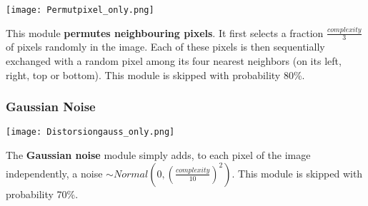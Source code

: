 \documentclass{article} %
\begin{document}
\begin{minipage}[t]{0.14\textwidth}
\begin{center}
\vspace*{1mm}
\texttt{[image: Permutpixel\_only.png]}
\end{center}
\end{minipage}%
\hspace{3mm}\begin{minipage}[t]{0.86\linewidth}
\vspace*{1mm}
This module {\bf permutes neighbouring pixels}. It first selects a
fraction $\frac{complexity}{3}$ of pixels randomly in the image. Each
of these pixels is then sequentially exchanged with a random pixel
among its four nearest neighbors (on its left, right, top or bottom).
This module is skipped with probability 80\%.\\
\end{minipage}


\subsubsection*{Gaussian Noise}

\begin{minipage}[t]{0.14\textwidth}
\begin{center}
\vspace*{0mm}
\texttt{[image: Distorsiongauss\_only.png]}
\end{center}
\end{minipage}%
\hspace{0.3cm}\begin{minipage}[t]{0.86\linewidth}
\vspace*{1mm}
The {\bf Gaussian noise} module simply adds, to each pixel of the image independently, a
noise $\sim Normal(0,(\frac{complexity}{10})^2)$.
This module is skipped with probability 70\%.
\end{minipage}
\end{document}
